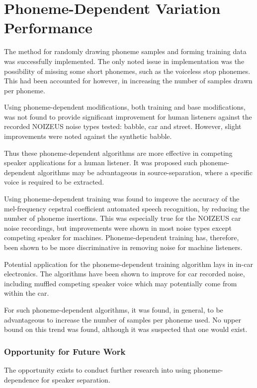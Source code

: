 \section{Phoneme-Dependent Variation Performance}

The method for randomly drawing phoneme samples and forming training
data was successfully implemented. The only noted issue in implementation
was the possibility of missing some short phonemes, such as the voiceless
stop phonemes. This had been accounted for however, in increasing
the number of samples drawn per phoneme.

Using phoneme-dependent modifications, both training and base modifications,
was not found to provide significant improvement for human listeners
against the recorded NOIZEUS noise types tested: babble, car and street.
However, slight improvements were noted against the synthetic babble.

Thus these phoneme-dependent algorithms are more effective in competing
speaker applications for a human listener. It was proposed such phoneme-dependent
algorithms may be advantageous in source-separation, where a specific
voice is required to be extracted.

Using phoneme-dependent training was found to improve the accuracy
of the mel-frequency cepstral coefficient automated speech recognition,
by reducing the number of phoneme insertions. This was especially
true for the NOIZEUS car noise recordings, but improvements were shown
in most noise types except competing speaker for machines. Phoneme-dependent
training has, therefore, been shown to be more discriminative in removing
noise for machine listeners.

Potential application for the phoneme-dependent training algorithm
lays in in-car electronics. The algorithms have been shown to improve
for car recorded noise, including muffled competing speaker voice
which may potentially come from within the car.

For such phoneme-dependent algorithms, it was found, in general, to
be advantageous to increase the number of samples per phoneme used.
No upper bound on this trend was found, although it was suspected
that one would exist.


\subsubsection*{Opportunity for Future Work}

The opportunity exists to conduct further research into using phoneme-dependence
for speaker separation.
